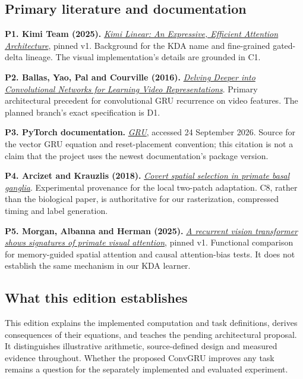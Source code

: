 \documentclass[
  11pt,
]{article}
\let\oldsubsection\subsection
\renewcommand{\subsection}{\Needspace{6\baselineskip}\oldsubsection}
\begin{document}
\subsection{Primary literature and
documentation}\label{primary-literature-and-documentation}

\textbf{P1. Kimi Team (2025).}
\href{https://arxiv.org/html/2510.26692v1}{\emph{Kimi Linear: An
Expressive, Efficient Attention Architecture}}, pinned v1. Background
for the KDA name and fine-grained gated-delta lineage. The visual
implementation's details are grounded in C1.

\textbf{P2. Ballas, Yao, Pal and Courville (2016).}
\href{https://arxiv.org/abs/1511.06432}{\emph{Delving Deeper into
Convolutional Networks for Learning Video Representations}}. Primary
architectural precedent for convolutional GRU recurrence on video
features. The planned branch's exact specification is D1.

\textbf{P3. PyTorch documentation.}
\href{https://docs.pytorch.org/docs/main/generated/torch.nn.GRU.html}{\emph{GRU}},
accessed 24 September 2026. Source for the vector GRU equation and
reset-placement convention; this citation is not a claim that the
project uses the newest documentation's package version.

\textbf{P4. Arcizet and Krauzlis (2018).}
\href{https://journals.plos.org/plosbiology/article?id=10.1371/journal.pbio.2005930}{\emph{Covert
spatial selection in primate basal ganglia}}. Experimental provenance
for the local two-patch adaptation. C8, rather than the biological
paper, is authoritative for our rasterization, compressed timing and
label generation.

\textbf{P5. Morgan, Albanna and Herman (2025).}
\href{https://arxiv.org/html/2502.10955v1}{\emph{A recurrent vision
transformer shows signatures of primate visual attention}}, pinned v1.
Functional comparison for memory-guided spatial attention and causal
attention-bias tests. It does not establish the same mechanism in our
KDA learner.

\subsection{What this edition
establishes}\label{what-this-edition-establishes}

This edition explains the implemented computation and task definitions,
derives consequences of their equations, and teaches the pending
architectural proposal. It distinguishes illustrative arithmetic,
source-defined design and measured evidence throughout. Whether the
proposed ConvGRU improves any task remains a question for the separately
implemented and evaluated experiment.
\end{document}
